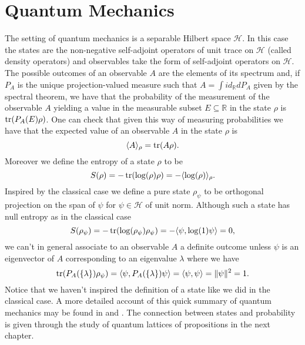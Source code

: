 \section{Quantum Mechanics}\label{sec:QM}

The setting of quantum mechanics is a separable Hilbert space $\mathcal{H}$. In this case the states are the non-negative self-adjoint operators of unit trace on $\mathcal{H}$ (called density operators) and observables take the form of self-adjoint operators on $\mathcal{H}$. The possible outcomes of an observable $A$ are the elements of its spectrum and, if $P_A$ is the unique projection-valued measure such that $A=\int id_\mathbb{R}dP_A$ given by the spectral theorem, we have that the probability of the measurement of the observable $A$ yielding a value in the measurable subset $E\subseteq\mathbb{R}$ in the state $\rho$ is $\operatorname{tr}(P_A(E)\rho)$. One can check that given this way of measuring probabilities we have that the expected value of an observable $A$ in the state $\rho$ is
\begin{equation}\label{eq:quantum_states}
\langle A\rangle_\rho = \operatorname{tr}(A\rho).
\end{equation}
Moreover we define the entropy of a state $\rho$ to be
\begin{equation}\label{eq:Q_entropy}
S(\rho)=-\operatorname{tr}(\log(\rho)\rho)=-\langle \log(\rho)\rangle_\rho.
\end{equation}
Inspired by the classical case we define a pure state $\rho_\psi$ to be orthogonal projection on the span of $\psi$ for $\psi\in\mathcal{H}$ of unit norm. Although such a state has null entropy as in the classical case
\begin{equation}\label{eqn:entropy_pure}
S(\rho_\psi)=-\operatorname{tr}(\log(\rho_\psi)\rho_\psi)=-\langle\psi,\log(1)\psi\rangle = 0,
\end{equation} 
we can't in general associate to an observable $A$ a definite outcome unless $\psi$ is an eigenvector of $A$ corresponding to an eigenvalue $\lambda$ where we have 
\begin{equation}
\operatorname{tr}(P_A(\{\lambda\})\rho_\psi)=\langle\psi,P_A(\{\lambda\})\psi\rangle=\langle\psi,\psi\rangle=\|\psi\|^2=1. 
\end{equation}
Notice that we haven't inspired the definition of a state like we did in the classical case. A more detailed account of this quick summary of quantum mechanics may be found in \cite{Strocchi2008a} and \cite{Hall2013}. The connection between states and probability is given through the study of quantum lattices of propositions in the next chapter.